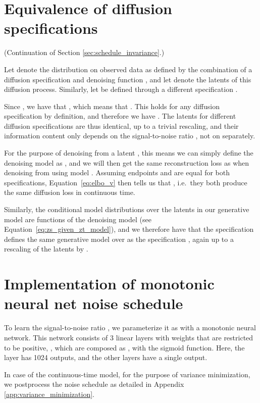 \documentclass{article}
\def\Eqref#1{Equation~\ref{#1}}
\begin{document}
\section{Equivalence of diffusion specifications}
\label{sec:app_equivalence}
(Continuation of Section \ref{sec:schedule_invariance}.)

Let  denote the distribution on observed data  as defined by the combination of a diffusion specification  and denoising function , and let  denote the latents of this diffusion process. Similarly, let  be defined through a different specification .

Since , we have that , which means that . This holds for any diffusion specification by definition, and therefore we have . The latents  for different diffusion specifications are thus identical, up to a trivial rescaling, and their information content only depends on the signal-to-noise ratio , not on  separately.

For the purpose of denoising from a latent , this means we can simply define the denoising model as , and we will then get the same reconstruction loss as when denoising from  using model . Assuming endpoints  and  are equal for both specifications, \Eqref{eq:elbo_v} then tells us that , i.e.\ they both produce the same diffusion loss in continuous time.

Similarly, the conditional model distributions over the latents  in our generative model are functions of the denoising model  (see Equation~\ref{eq:zs_given_zt_model}), and we therefore have that the specification  defines the same generative model over  as the specification , again up to a rescaling of the latents by .

\section{Implementation of monotonic neural net noise schedule }
\label{app:monotonicnn}

To learn the signal-to-noise ratio , we parameterize it as  with  a monotonic neural network. This network consists of 3 linear layers with weights that are restricted to be positive, , which are composed as , with  the sigmoid function. Here, the  layer has 1024 outputs, and the other layers have a single output.

In case of the continuous-time model, for the purpose of variance minimization, we postprocess the noise schedule as detailed in Appendix \ref{app:variance_minimization}.
\end{document}
